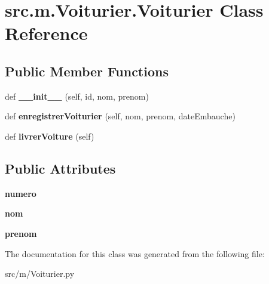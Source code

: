 \hypertarget{classsrc_1_1m_1_1_voiturier_1_1_voiturier}{}\section{src.\+m.\+Voiturier.\+Voiturier Class Reference}
\label{classsrc_1_1m_1_1_voiturier_1_1_voiturier}
\subsection*{Public Member Functions}
\begin{DoxyCompactItemize}
\item 
\hypertarget{classsrc_1_1m_1_1_voiturier_1_1_voiturier_afd9fc86d685d204e61b580e475c56e1b}{}def {\bfseries \+\_\+\+\_\+init\+\_\+\+\_\+} (self, id, nom, prenom)\label{classsrc_1_1m_1_1_voiturier_1_1_voiturier_afd9fc86d685d204e61b580e475c56e1b}

\item 
\hypertarget{classsrc_1_1m_1_1_voiturier_1_1_voiturier_a6cb5b9052f770c96948b88e6d4939d87}{}def {\bfseries enregistrer\+Voiturier} (self, nom, prenom, date\+Embauche)\label{classsrc_1_1m_1_1_voiturier_1_1_voiturier_a6cb5b9052f770c96948b88e6d4939d87}

\item 
\hypertarget{classsrc_1_1m_1_1_voiturier_1_1_voiturier_ac1132d9beae45927947b70aa79dee180}{}def {\bfseries livrer\+Voiture} (self)\label{classsrc_1_1m_1_1_voiturier_1_1_voiturier_ac1132d9beae45927947b70aa79dee180}

\end{DoxyCompactItemize}
\subsection*{Public Attributes}
\begin{DoxyCompactItemize}
\item 
\hypertarget{classsrc_1_1m_1_1_voiturier_1_1_voiturier_ab3b130bb768cbbe7cd495e27a9466edd}{}{\bfseries numero}\label{classsrc_1_1m_1_1_voiturier_1_1_voiturier_ab3b130bb768cbbe7cd495e27a9466edd}

\item 
\hypertarget{classsrc_1_1m_1_1_voiturier_1_1_voiturier_a5ce772293390d177da2943edb283af2a}{}{\bfseries nom}\label{classsrc_1_1m_1_1_voiturier_1_1_voiturier_a5ce772293390d177da2943edb283af2a}

\item 
\hypertarget{classsrc_1_1m_1_1_voiturier_1_1_voiturier_a9995203fe1cce69a6c2c05bfdc79b1d7}{}{\bfseries prenom}\label{classsrc_1_1m_1_1_voiturier_1_1_voiturier_a9995203fe1cce69a6c2c05bfdc79b1d7}

\end{DoxyCompactItemize}


The documentation for this class was generated from the following file\+:\begin{DoxyCompactItemize}
\item 
src/m/Voiturier.\+py\end{DoxyCompactItemize}
